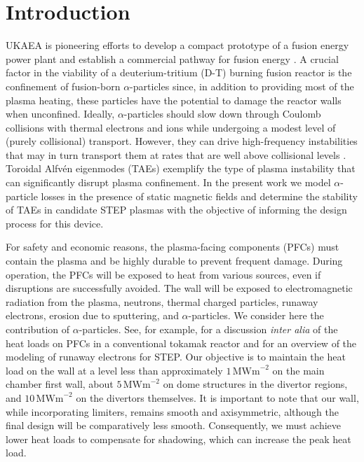 \documentclass[10pt, a4paper, twoside]{article}
\begin{document}
\setlength{\parindent}{0pt}
\fontsize{10}{13}\selectfont

\section{Introduction}
\label{sec:introduction}

UKAEA is pioneering efforts to develop a compact prototype of a fusion energy power plant and establish a commercial pathway for fusion energy \cite{nuttall2020, meyer2023}. A crucial factor in the viability of a deuterium-tritium (D-T) burning fusion reactor is the confinement of fusion-born $\alpha$-particles since, in addition to providing most of the plasma heating, these particles have the potential to damage the reactor walls when unconfined. Ideally, $\alpha$-particles should slow down through Coulomb collisions with thermal electrons and ions while undergoing a modest level of (purely collisional) transport. However, they can drive high-frequency instabilities that may in turn transport them at rates that are well above collisional levels \cite{garcia-munoz2011}. Toroidal Alfv\'en eigenmodes (TAEs) exemplify the type of plasma instability that can significantly disrupt plasma confinement. In the present work we model $\alpha$-particle losses in the presence of static magnetic fields and determine the stability of TAEs in candidate STEP plasmas with the objective of informing the design process for this device.

For safety and economic reasons, the plasma-facing components (PFCs) must contain the plasma and be highly durable to prevent frequent damage. During operation, the PFCs will be exposed to heat from various sources, even if disruptions are successfully avoided. The wall will be exposed to electromagnetic radiation from the plasma, neutrons, thermal charged particles, runaway electrons, erosion due to sputtering, and $\alpha$-particles. We consider here the contribution of $\alpha$-particles. See, for example, \cite{bachmann2018} for a discussion {\it inter alia} of the heat loads on PFCs in a conventional tokamak reactor and \cite{fil2023} for an overview of the modeling of runaway electrons for STEP. Our objective is to maintain the heat load on the wall at a level less than approximately $1\, \text{MWm}^{-2}$ on the main chamber first wall, about $5\, \text{MWm}^{-2}$ on dome structures in the divertor regions, and $10\, \text{MWm}^{-2}$ on the divertors themselves. It is important to note that our wall, while incorporating limiters, remains smooth and axisymmetric, although the final design will be comparatively less smooth. Consequently, we must achieve lower heat loads to compensate for shadowing, which can increase the peak heat load.
\end{document}
